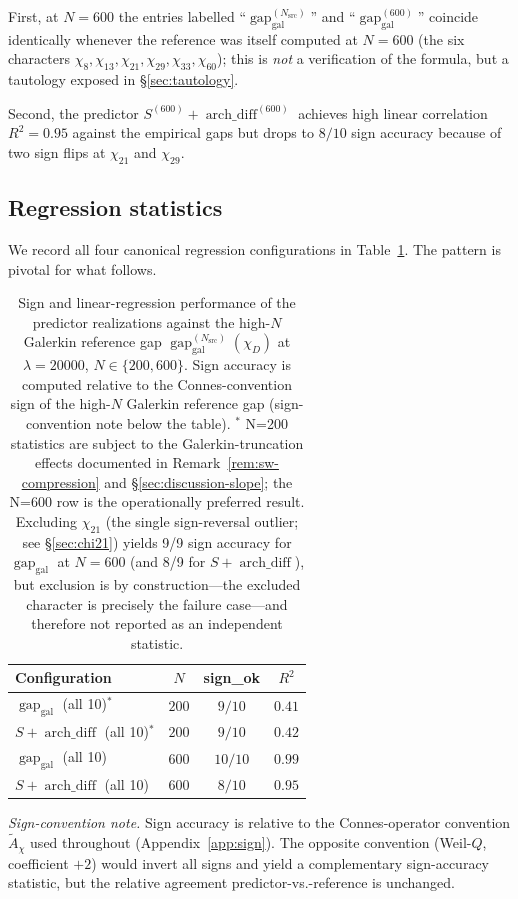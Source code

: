 \documentclass[10pt,twocolumn]{article}
\theoremstyle{definition}
\theoremstyle{remark}
\newcommand{\gap}{\operatorname{gap}}
\newcommand{\chifn}{\chi}
\newcommand{\archdiff}{\operatorname{arch\_diff}}
\begin{document}
First, at $N=600$ the entries labelled
``$\gap_{\mathrm{gal}}^{(N_{\mathrm{src}})}$'' and
``$\gap_{\mathrm{gal}}^{(600)}$'' coincide identically whenever the
reference was itself computed at $N=600$ (the six characters
$\chifn_8,\chifn_{13},\chifn_{21},\chifn_{29},\chifn_{33},\chifn_{60}$);
this is \emph{not} a verification of the formula, but a tautology
exposed in \S\ref{sec:tautology}.

Second, the predictor $S^{(600)}+\archdiff^{(600)}$ achieves high
linear correlation $R^2=0.95$ against the empirical gaps but drops
to $8/10$ sign accuracy because of two sign flips at $\chifn_{21}$
and $\chifn_{29}$.

\subsection{Regression statistics}
\label{sec:validation-regression}

We record all four canonical regression configurations in
Table~\ref{tab:regression}. The pattern is pivotal for what follows.

\begin{table}[t]
\caption{Sign and linear-regression performance of the predictor
  realizations against the high-$N$ Galerkin reference gap
  $\gap_{\mathrm{gal}}^{(N_{\mathrm{src}})}(\chifn_D)$ at $\lambda=20000$,
  $N\in\{200,600\}$. Sign accuracy is computed relative to the
  Connes-convention sign of the high-$N$ Galerkin reference gap
  (sign-convention note below the table).
  $^*$ N=200 statistics are subject to the Galerkin-truncation
  effects documented in Remark~\ref{rem:sw-compression} and
  \S\ref{sec:discussion-slope}; the N=600 row is the operationally
  preferred result.
  Excluding $\chifn_{21}$ (the single sign-reversal outlier; see
  \S\ref{sec:chi21}) yields 9/9 sign accuracy for $\gap_{\mathrm{gal}}$
  at $N=600$ (and 8/9 for $S+\archdiff$), but exclusion is by
  construction---the excluded character is precisely the failure
  case---and therefore not reported as an independent statistic.}
\label{tab:regression}
\centering
\small
\begin{tabular}{@{}lccc@{}}
\toprule
Configuration & $N$ & sign\_ok & $R^2$ \\
\midrule
$\gap_{\mathrm{gal}}$ (all 10)$^*$ & $200$ & $9/10$ & $0.41$ \\
$S+\archdiff$ (all 10)$^*$ & $200$ & $9/10$ & $0.42$ \\
\midrule
$\gap_{\mathrm{gal}}$ (all 10) & $600$ & $10/10$ & $0.99$ \\
$S+\archdiff$ (all 10) & $600$ & $8/10$ & $0.95$ \\
\bottomrule
\end{tabular}

\smallskip
\footnotesize
\textit{Sign-convention note.} Sign accuracy is relative to the
Connes-operator convention $\tilde{A}_\chi$ used throughout
(Appendix~\ref{app:sign}). The opposite convention (Weil-$Q$,
coefficient $+2$) would invert all signs and yield a complementary
sign-accuracy statistic, but the relative agreement
predictor-vs.-reference is unchanged.
\end{table}
\end{document}
